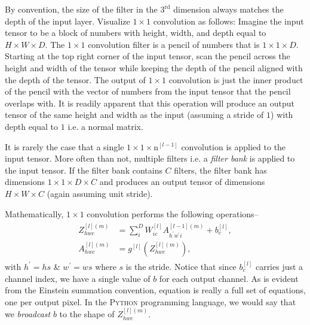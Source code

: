 \documentclass[modern]{aastex61}
\newcommand{\un}{\mathrm{n}}
\begin{document}
By convention, the size of the filter in the $3^{\mathrm{rd}}$ dimension always matches the depth of the input layer. Visualize $1 \times 1$ convolution as follows: Imagine the input tensor to be a block of numbers with height, width, and depth equal to $H \times W \times D$. The $1 \times 1$ convolution filter is a pencil of numbers that is $1 \times 1 \times D$. Starting at the top right corner of the input tensor, scan the pencil across the height and width of the tensor while keeping the depth of the pencil aligned with the depth of the tensor. The output of $1 \times 1$ convolution is just the inner product of the pencil with the vector of numbers from the input tensor that the pencil overlaps with. It is readily apparent that this operation will produce an output tensor of the same height and width as the input (assuming a stride of $1$) with depth equal to $1$ i.e. a normal matrix.

It is rarely the case that a single $1 \times 1 \times \un^{[l-1]}$ convolution is applied to the input tensor. More often than not, multiple filters i.e. a \textit{filter bank} is applied to the input tensor. If the filter bank contains $C$ filters, the filter bank has dimensions $1 \times 1 \times D \times C$ and produces an output tensor of dimensions $H \times W \times C$ (again assuming unit stride).

Mathematically, $1 \times 1$ convolution performs the following operations--
\begin{align} \label{eq:conv11}
\begin{split}
  Z^{[l](m)}_{hwc} &= \sum_{i}^{D} W^{[l]}_{ic}A^{[l-1](m)}_{h^{'}w^{'}i} + b^{[l]}_{c},
\\
  A^{[l](m)}_{hwc} &= g^{[l]}(Z^{[l](m)}_{hwc}),
\end{split}
\end{align}
with $h^{'} = hs$ \& $w^{'} = ws$ where $s$ is the stride. Notice that since $b^{[l]}_{c} $ carries just a channel index, we have a single value of $b$ for each output channel. As is evident from the Einstein summation convention, equation \label{eq:conv11} is really a full set of equations, one per output pixel. In the \textsc{Python} programming language, we would say that we \textit{broadcast} $b$ to the shape of $Z^{[l](m)}_{hwc}$.
\end{document}
